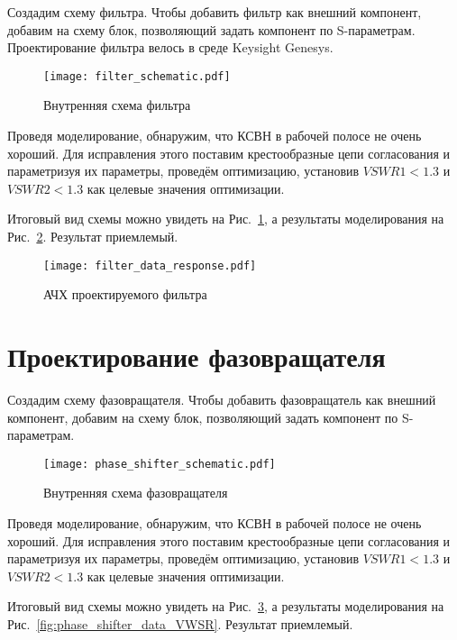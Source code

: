 Создадим схему фильтра.
Чтобы добавить фильтр как внешний компонент, добавим на схему блок, позволяющий задать компонент по S-параметрам.
Проектирование фильтра велось в среде Keysight Genesys.

\begin{figure}[!ht]
    \centering
    \texttt{[image: filter\_schematic.pdf]}
    \caption{Внутренняя схема фильтра}%
    \label{fig:filter_schematic}
\end{figure}

Проведя моделирование, обнаружим, что КСВН в рабочей полосе не очень хороший.
Для исправления этого поставим крестообразные цепи согласования и параметризуя их параметры, проведём оптимизацию, установив $VSWR1 < 1.3$ и $VSWR2 < 1.3$ как целевые значения оптимизации.

Итоговый вид схемы можно увидеть на Рис.~\ref{fig:filter_schematic}, а результаты моделирования на Рис.~\ref{fig:filter_data_response}.
Результат приемлемый.

\begin{figure}[!ht]
    \centering
    \texttt{[image: filter\_data\_response.pdf]}
    \caption{АЧХ проектируемого фильтра}%
    \label{fig:filter_data_response}
\end{figure}

\section{Проектирование фазовращателя}

Создадим схему фазовращателя.
Чтобы добавить фазовращатель как внешний компонент, добавим на схему блок, позволяющий задать компонент по S-параметрам.

\begin{figure}[!ht]
    \centering
    \texttt{[image: phase\_shifter\_schematic.pdf]}
    \caption{Внутренняя схема фазовращателя}%
    \label{fig:phase_shifter_schematic}
\end{figure}

Проведя моделирование, обнаружим, что КСВН в рабочей полосе не очень хороший.
Для исправления этого поставим крестообразные цепи согласования и параметризуя их параметры, проведём оптимизацию, установив $VSWR1 < 1.3$ и $VSWR2 < 1.3$ как целевые значения оптимизации.

Итоговый вид схемы можно увидеть на Рис.~\ref{fig:phase_shifter_schematic}, а результаты моделирования на Рис.~\ref{fig:phase_shifter_data_VWSR}.
Результат приемлемый.

